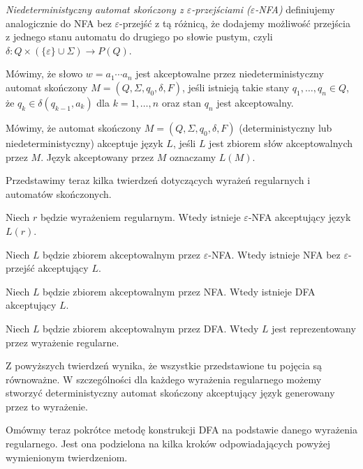 \begin{definition}
    \emph{Niedeterministyczny automat skończony z $\varepsilon$-przejściami ($\varepsilon$-NFA)} definiujemy analogicznie do NFA bez $\varepsilon$-przejść z tą różnicą, że dodajemy możliwość przejścia z jednego stanu automatu do drugiego po słowie pustym, czyli $\delta:Q\times(\{\varepsilon\}\cup\Sigma)\to P(Q)$. 
\end{definition}
Mówimy, że słowo $w=a_1\dotsm a_n$ jest akceptowalne przez niedeterministyczny automat skończony $M=(Q,\Sigma,q_0,\delta,F)$, jeśli istnieją takie stany $q_1,\dotsc,q_n\in Q$, że $q_k\in\delta(q_{k-1},a_k)$ dla $k=1,\dotsc,n$ oraz stan $q_n$ jest akceptowalny.

Mówimy, że automat skończony $M=(Q,\Sigma,q_0,\delta,F)$ (deterministyczny lub niedeterministyczny) akceptuje język $L$, jeśli $L$ jest zbiorem słów akceptowalnych przez $M$. Język akceptowany przez $M$ oznaczamy $L(M)$.

Przedstawimy teraz kilka twierdzeń dotyczących wyrażeń regularnych i automatów skończonych.

\begin{theorem}
    Niech $r$ będzie wyrażeniem regularnym. Wtedy istnieje $\varepsilon$-NFA akceptujący język $L(r)$.
\end{theorem}

\begin{theorem}
    Niech $L$ będzie zbiorem akceptowalnym przez $\varepsilon$-NFA. Wtedy istnieje NFA bez $
    \varepsilon$-przejść akceptujący $L$.    
\end{theorem}

\begin{theorem}
    Niech $L$ będzie zbiorem akceptowalnym przez NFA. Wtedy istnieje DFA akceptujący $L$.
\end{theorem}

\begin{theorem}
    Niech $L$ będzie zbiorem akceptowalnym przez DFA. Wtedy $L$ jest reprezentowany przez wyrażenie regularne.
\end{theorem}

Z powyższych twierdzeń wynika, że wszystkie przedstawione tu pojęcia są równoważne. W szczególności dla każdego wyrażenia regularnego możemy stworzyć deterministyczny automat skończony akceptujący język generowany przez to wyrażenie. 


Omówmy teraz pokrótce metodę konstrukcji DFA na podstawie danego wyrażenia regularnego. Jest ona podzielona na kilka kroków odpowiadających powyżej wymienionym twierdzeniom.

